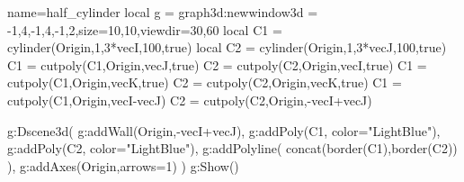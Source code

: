 \documentclass{standalone}
\begin{document}
\begin{luadraw}{name=half_cylinder}
local g = graph3d:new{window3d = {-1,4,-1,4,-1,2},size={10,10},viewdir={30,60}}
local C1 = cylinder(Origin,1,3*vecI,100,true)
local C2 = cylinder(Origin,1,3*vecJ,100,true)
C1 = cutpoly(C1,{Origin,vecJ},true)
C2 = cutpoly(C2,{Origin,vecI},true)
C1 = cutpoly(C1,{Origin,vecK},true)
C2 = cutpoly(C2,{Origin,vecK},true)
C1 = cutpoly(C1,{Origin,vecI-vecJ})
C2 = cutpoly(C2,{Origin,-vecI+vecJ})

g:Dscene3d(
    g:addWall({Origin,-vecI+vecJ}),
    g:addPoly(C1, {color="LightBlue"}),
    g:addPoly(C2, {color="LightBlue"}),
    g:addPolyline( concat(border(C1),border(C2)) ),
    g:addAxes(Origin,{arrows=1})
)
 g:Show()
\end{luadraw}
\end{document}
